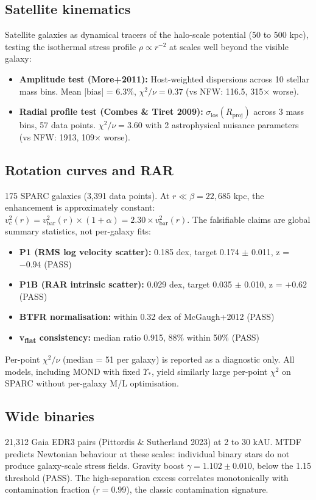 \documentclass[11pt,a4paper]{article}
\begin{document}
\subsection{Satellite kinematics}
Satellite galaxies as dynamical tracers of the halo-scale potential (50 to 500 kpc), testing the isothermal stress profile $\rho \propto r^{-2}$ at scales well beyond the visible galaxy:

\begin{itemize}
  \item \textbf{Amplitude test (More+2011):} Host-weighted dispersions across 10 stellar mass bins. Mean |bias| = 6.3\%, $\chi^2/\nu = 0.37$ (vs NFW: 116.5, 315$\times$ worse).
  \item \textbf{Radial profile test (Combes \& Tiret 2009):} $\sigma_\text{los}(R_\text{proj})$ across 3 mass bins, 57 data points. $\chi^2/\nu = 3.60$ with 2 astrophysical nuisance parameters (vs NFW: 1913, 109$\times$ worse).
\end{itemize}

\subsection{Rotation curves and RAR}
175 SPARC galaxies (3,391 data points). At $r \ll \beta = 22{,}685$ kpc, the enhancement is approximately constant: $v_c^2(r) = v_\text{bar}^2(r) \times (1 + \alpha) = 2.30 \times v_\text{bar}^2(r)$. The falsifiable claims are global summary statistics, not per-galaxy fits:

\begin{itemize}
  \item \textbf{P1 (RMS log velocity scatter):} 0.185 dex, target 0.174 $\pm$ 0.011, z = $-0.94$ (PASS)
  \item \textbf{P1B (RAR intrinsic scatter):} 0.029 dex, target 0.035 $\pm$ 0.010, z = $+0.62$ (PASS)
  \item \textbf{BTFR normalisation:} within 0.32 dex of McGaugh+2012 (PASS)
  \item \textbf{v\textsubscript{flat} consistency:} median ratio 0.915, 88\% within 50\% (PASS)
\end{itemize}

Per-point $\chi^2/\nu$ (median = 51 per galaxy) is reported as a diagnostic only. All models, including MOND with fixed $\Upsilon_*$, yield similarly large per-point $\chi^2$ on SPARC without per-galaxy M/\allowbreak{}L optimisation.

\subsection{Wide binaries}
21,312 Gaia EDR3 pairs (Pittordis \& Sutherland 2023) at 2 to 30 kAU. MTDF predicts Newtonian behaviour at these scales: individual binary stars do not produce galaxy-scale stress fields. Gravity boost $\gamma = 1.102 \pm 0.010$, below the 1.15 threshold (PASS). The high-separation excess correlates monotonically with contamination fraction ($r = 0.99$), the classic contamination signature.
\end{document}
